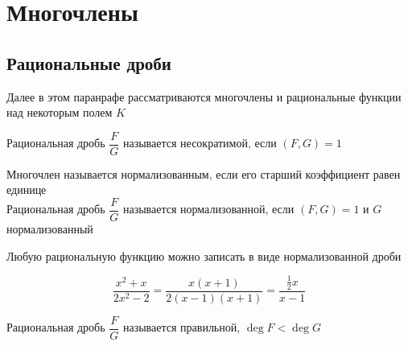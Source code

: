 \chapter{Многочлены}

\section{Рациональные дроби}

Далее в этом паранрафе рассматриваются многочлены и рациональные функции над некоторым полем $K$

\begin{definition}
    Рациональная дробь $\dfrac{F}G$ называется несократимой, если $(F, G) = 1$
\end{definition}

\begin{definition}
	Многочлен называется нормализованным, если его старший коэффициент равен единице \\
    Рациональная дробь $\dfrac{F}G$ называется нормализованной, если $(F, G) = 1$ и $G$ нормализованный
\end{definition}

\begin{property}
	Любую рациональную функцию можно записать в виде нормализованной дроби
\end{property}

\begin{eg}
    $$ \frac{x^2 + x}{2x^2 - 2} = \frac{x(x + 1)}{2(x - 1)(x + 1)} = \frac{\frac12 x}{x - 1} $$
\end{eg}

\begin{definition}
    Рациональная дробь $\dfrac{F}G$ называется правильной, $\deg F < \deg G$
\end{definition}

